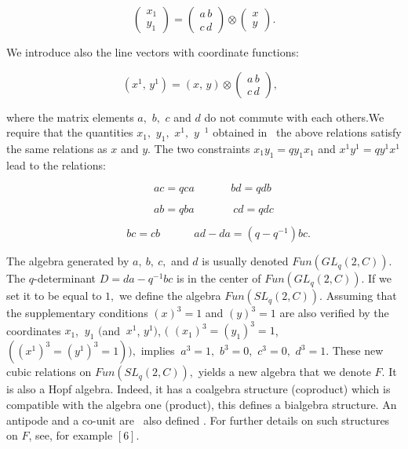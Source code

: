 \documentclass[a4paper,12pt,thmsa]{article}
\begin{document}
\[
\left(
\begin{array}{c}
x_{1} \\
y_{1}
\end{array}
\right) =\left(
\begin{array}{c}
a\, b \\ c\, d
\end{array}
\right) \otimes \left(
\begin{array}{c}
x \\
y
\end{array}
\right) .
\]

We introduce also the line vectors with coordinate functions:

\[
\left( x^1,\, y^1\right) =\left( x,\, y\right) \otimes \left(
\begin{array}{c}
a\, b \\ c\, d
\end{array}
\right) ,\ \ \
\]

where the matrix elements $a,$ $b,$ $c$ and $d$ do not commute with each
others.We require that the quantities $x_1,$ $y_1,$ $x^1,$ $y$\ $^1$
obtained in \ the above relations satisfy the same relations as $x$ and $y.$
The two constraints $x_1y_1=qy_1x_1$ and $x^1y^1=qy^1x^1$ lead to the
relations:

$\ \ \ \ \ \ \ \ \ \ \ \ \ \ \ \ \ \ \ \ \ \ \ \ \ \ \ \ \ \ \ \ \ \ \ \ \ \
\ \ \ \ \ \ \ \ \ \ \ \ \ \ \ \ \ \ \ \ \ \ \ \ \ \ \ \ \ \ \ \ \ \ \ \ $%
\[
\ \ \ \ \ \ \ ac=qca\ \ \ \ \ \ \ \ \ \ \ \ \ \ \ bd=qdb
\]

$\ \ \ \ \ \ \ \ \ \ \ \ \ \ \ \ \ \ \ \ \ \ \ \ \ \ \ \ \ \ \ \ \ \ \ \ \ \
\ \ \ \ \ \ \ \ \ \ \ \ \ \ \ \ \ \ \ \ \ \ \ \ \ \ \ \ \ \ \ \ \ \ \ $%
\[
\ \ \ \ \ \ \ \ ab=qba\ \ \ \ \ \ \ \ \ \ \ \ \ \ \ \ cd=qdc
\]

$\ \ \ \ \ \ \ \ \ \ \ \ \ \ \ \ \ \ \ \ \ \ \ \ \ \ \ \ \ \ \ \ \ \ \ \ \ \
\ \ \ \ \ \ \ \ \ \ \ \ \ \ \ \ \ \ \ \ \ \ \ \ \ \ \ \ \ \ \ \ \ $%
\[
\ \ \ \ \ \ \ \ \ \ \ \ bc=cb\ \ \ \ \ \ \ \ \ \ \ \ \ \ ad-da=(q-q^{-1})bc.
\]

The algebra generated by $a,\ b,\ c,$ and $d$ is usually denoted $%
Fun(GL_q(2,C)).$ The $q$-determinant $D=da-q^{-1}bc$ is in the center of $%
Fun(GL_q(2,C)).$ If we set it to be equal to $1,$ we define the algebra $%
Fun(SL_q(2,C)).$ Assuming that the supplementary conditions $(x)^3=1$ and $%
(y)^3=1$ are also verified by the coordinates $x_1$, $\ y_1$ $($and $\ x^1$,
$y^1)$, $($ $(x_1)^3=(y_1)^3=1$, $((x^1)^3=(y^1)^3=1)),$ implies $\ a^3=1,$ $%
b^3=0,$ $c^3=0,$ $d^3=1$. These new cubic relations on $Fun(SL_q(2,C)),$
yields a new algebra that we denote $F$. It is also a Hopf algebra. Indeed,
it has a coalgebra structure (coproduct) which is compatible with the
algebra one (product), this defines a bialgebra structure. An antipode and a
co-unit are ~also defined . For further details on such structures on $F$,
see, for example $[6]$.
\end{document}
